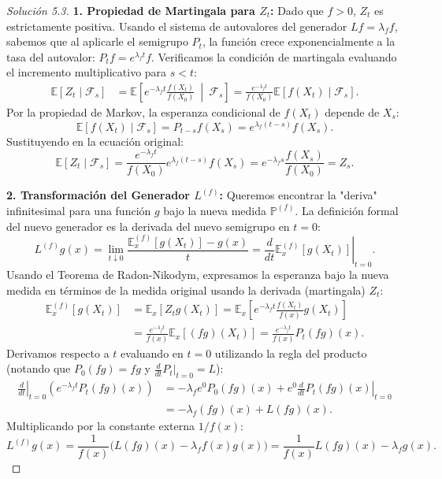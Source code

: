 \documentclass[10pt,a4paper]{article}
\begin{document}
\begin{proof}[Solución  5.3]
    \textbf{1. Propiedad de Martingala para $Z_t$:}
    Dado que $f>0$, $Z_t$ es estrictamente positiva. Usando el sistema de autovalores del generador $Lf = \lambda_f f$, sabemos que al aplicarle el semigrupo $P_t$, la función crece exponencialmente a la tasa del autovalor: $P_t f = e^{\lambda_f t} f$.
    Verificamos la condición de martingala evaluando el incremento multiplicativo para $s < t$:
    \begin{align*}
        \mathbb{E}[Z_t \mid \mathcal{F}_s] &= \mathbb{E} \left[ e^{-\lambda_f t} \frac{f(X_t)}{f(X_0)} \ \middle| \ \mathcal{F}_s \right] = \frac{e^{-\lambda_f t}}{f(X_0)} \mathbb{E}[f(X_t) \mid \mathcal{F}_s].
    \end{align*}
    Por la propiedad de Markov, la esperanza condicional de $f(X_t)$ depende de $X_s$:
    \[ \mathbb{E}[f(X_t) \mid \mathcal{F}_s] = P_{t-s} f(X_s) = e^{\lambda_f(t-s)} f(X_s). \]
    Sustituyendo en la ecuación original:
    \[ \mathbb{E}[Z_t \mid \mathcal{F}_s] = \frac{e^{-\lambda_f t}}{f(X_0)} e^{\lambda_f(t-s)} f(X_s) = e^{-\lambda_f s} \frac{f(X_s)}{f(X_0)} = Z_s. \]
    
    \textbf{2. Transformación del Generador $L^{(f)}$:}
    Queremos encontrar la "deriva" infinitesimal para una función $g$ bajo la nueva medida $\mathbb{P}^{(f)}$. 
    La definición formal del nuevo generador es la derivada del nuevo semigrupo en $t=0$:
    \[ L^{(f)}g(x) = \lim_{t \downarrow 0} \frac{\mathbb{E}_x^{(f)}[g(X_t)] - g(x)}{t} = \left. \frac{d}{dt} \mathbb{E}_x^{(f)}[g(X_t)] \right|_{t=0}. \]
    Usando el Teorema de Radon-Nikodym, expresamos la esperanza bajo la nueva medida en términos de la medida original usando la derivada (martingala) $Z_t$:
    \begin{align*}
        \mathbb{E}_x^{(f)}[g(X_t)] &= \mathbb{E}_x[Z_t g(X_t)] = \mathbb{E}_x \left[ e^{-\lambda_f t} \frac{f(X_t)}{f(x)} g(X_t) \right] \\
        &= \frac{e^{-\lambda_f t}}{f(x)} \mathbb{E}_x[(fg)(X_t)] = \frac{e^{-\lambda_f t}}{f(x)} P_t(fg)(x).
    \end{align*}
    Derivamos respecto a $t$ evaluando en $t=0$ utilizando la regla del producto (notando que $P_0(fg) = fg$ y $\frac{d}{dt}P_t|_{t=0} = L$):
    \begin{align*}
        \left. \frac{d}{dt} \right|_{t=0} \left( e^{-\lambda_f t} P_t(fg)(x) \right) &= -\lambda_f e^0 P_0(fg)(x) + e^0 \left. \frac{d}{dt} P_t(fg)(x) \right|_{t=0} \\
        &= -\lambda_f (fg)(x) + L(fg)(x).
    \end{align*}
    Multiplicando por la constante externa $1/f(x)$:
    \[ L^{(f)}g(x) = \frac{1}{f(x)} \Big( L(fg)(x) - \lambda_f f(x)g(x) \Big) = \frac{1}{f(x)} L(fg)(x) - \lambda_f g(x). \]


\end{proof}
\end{document}
